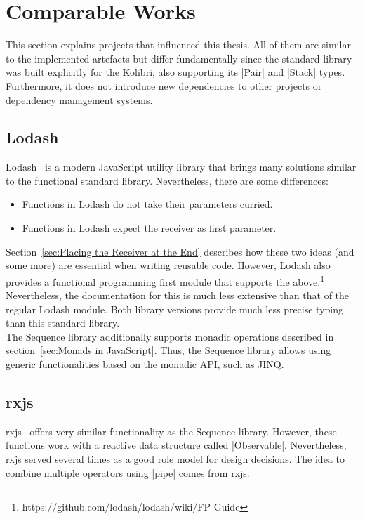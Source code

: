\section{Comparable Works} %
\label{sec:Comparable Works}
This section explains projects that influenced this thesis. All of them are
similar to the implemented artefacts but differ fundamentally since the
standard library was built explicitly for the Kolibri, also supporting its
|Pair| and |Stack| types. Furthermore, it does not introduce new dependencies
to other projects or dependency management systems.

\subsection{Lodash} %
\label{sub:Lodash}
Lodash~\cite{lodash_2023} is a modern JavaScript utility library that brings many solutions
similar to the functional standard library. Nevertheless, there are some differences:
\begin{itemize}
  \item Functions in Lodash do not take their parameters curried.
  \item Functions in Lodash expect the receiver as first parameter.
\end{itemize}
Section~\ref{sec:Placing the Receiver at the End} describes how these two
ideas (and some more) are essential when writing reusable code. However, Lodash
also provides a functional programming first module that supports the
above.\footnote{https://github.com/lodash/lodash/wiki/FP-Guide}
Nevertheless, the documentation for this is much less extensive than that of
the regular Lodash module. Both library versions provide much less precise
typing than this standard library.\\
The Sequence library additionally supports monadic operations described in
section~\ref{sec:Monads in JavaScript}. Thus, the Sequence
library allows using generic functionalities based on the monadic API, such as
JINQ.

\subsection{rxjs} %
\label{sub:rxjs}
rxjs~\cite{rxjs_2023} offers very similar functionality as the Sequence library.
However, these functions work with a reactive data structure called
|Observable|. Nevertheless, rxjs served several times as a good role model for
design decisions. The idea to combine multiple operators using |pipe| comes
from rxjs.


